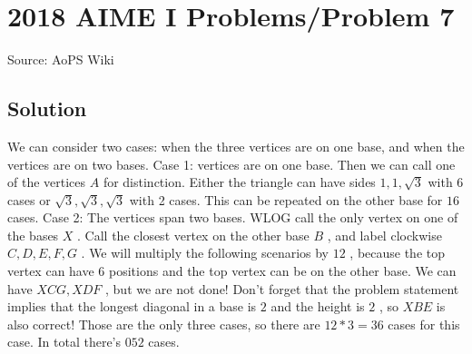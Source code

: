 \documentclass[12pt]{article}
\begin{document}
\section*{{2018 AIME I Problems/Problem 7}}
Source: AoPS Wiki

\subsection*{Solution}
We can consider two cases: when the three vertices are on one base, and when the vertices are on two bases. Case 1: vertices are on one base. Then we can call one of the vertices $A$ for distinction. Either the triangle can have sides $1, 1, \sqrt{3}$ with 6 cases or $\sqrt{3}, \sqrt{3}, \sqrt{3}$ with 2 cases. This can be repeated on the other base for $16$ cases. Case 2: The vertices span two bases. WLOG call the only vertex on one of the bases $X$ . Call the closest vertex on the other base $B$ , and label clockwise $C, D, E, F, G$ . We will multiply the following scenarios by $12$ , because the top vertex can have $6$ positions and the top vertex can be on the other base. We can have $XCG, XDF$ , but we are not done! Don't forget that the problem statement implies that the longest diagonal in a base is $2$ and the height is $2$ , so $XBE$ is also correct! Those are the only three cases, so there are $12*3=36$ cases for this case. In total there's $\boxed{052}$ cases.
\end{document}
